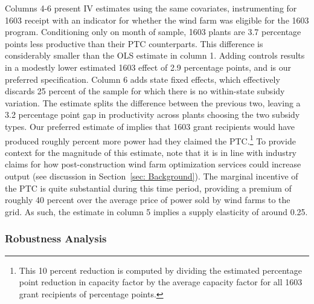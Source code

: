 \documentclass[12pt]{article}
\begin{document}
Columns 4-6 present IV estimates using the same covariates, instrumenting for 1603 receipt with an indicator for whether the wind farm was eligible for the 1603 program. Conditioning only on month of sample, 1603 plants are 3.7 percentage points less productive than their PTC counterparts. This difference is considerably smaller than the OLS estimate in column 1. Adding controls results in a modestly lower estimated 1603 effect of 2.9 percentage points, and is our preferred specification. Column 6 adds state fixed effects, which effectively discards 25 percent of the sample for which there is no within-state subsidy variation. The estimate splits the difference between the previous two, leaving a 3.2 percentage point gap in productivity across plants choosing the two subsidy types. Our preferred estimate of implies that 1603 grant recipients would have produced roughly percent more power had they claimed the PTC.\footnote{This 10 percent reduction is computed by dividing the estimated percentage point reduction in capacity factor by the average capacity factor for all 1603 grant recipients of percentage points.} To provide context for the magnitude of this estimate, note that it is in line with industry claims for how post-construction wind farm optimization services could increase output (see discussion in Section~\ref{sec: Background}). The marginal incentive of the PTC is quite substantial during this time period, providing a premium of roughly 40 percent over the average price of power sold by wind farms to the grid. As such, the estimate in column 5 implies a supply elasticity of around 0.25. 

\subsubsection*{Robustness Analysis}
\end{document}
